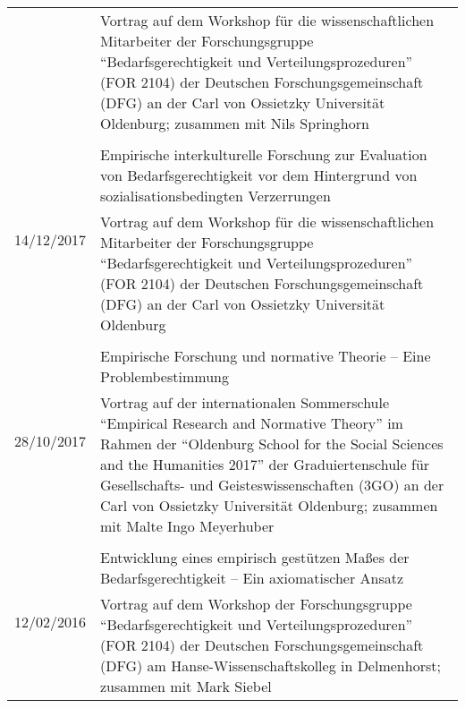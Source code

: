 \documentclass[a4paper,10pt]{article}
\begin{document}
\begin{longtable}{p{2cm}p{}}
& \footnotesize{Vortrag auf dem Workshop für die wissenschaftlichen Mitarbeiter der Forschungsgruppe \enquote{Bedarfsgerechtigkeit und Verteilungsprozeduren} (FOR 2104) der Deutschen Forschungsgemeinschaft (DFG) an der Carl von Ossietzky Universität Oldenburg; zusammen mit Nils Springhorn}\\
\\
\multirow{2}{2cm}{\footnotesize{14/12/2017}} & Empirische interkulturelle Forschung zur Evaluation von Bedarfsgerechtigkeit vor dem Hintergrund von sozialisationsbedingten Verzerrungen\\
& \footnotesize{Vortrag auf dem Workshop für die wissenschaftlichen Mitarbeiter der Forschungsgruppe \enquote{Bedarfsgerechtigkeit und Verteilungsprozeduren} (FOR 2104) der Deutschen Forschungsgemeinschaft (DFG) an der Carl von Ossietzky Universität Oldenburg}\\
\\
\multirow{2}{2cm}{\footnotesize{28/10/2017}} & Empirische Forschung und normative Theorie -- Eine Problembestimmung\\
& \footnotesize{Vortrag auf der internationalen Sommerschule \enquote{Empirical Research and Normative Theory} im Rahmen der \enquote{Oldenburg School for the Social Sciences and the Humanities 2017} der Graduiertenschule für Gesellschafts- und Geisteswissenschaften (3GO) an der Carl von Ossietzky Universität Oldenburg; zusammen mit Malte Ingo Meyerhuber}\\
\\
\multirow{2}{2cm}{\footnotesize{12/02/2016}} & Entwicklung eines empirisch gestützen Maßes der Bedarfsgerechtigkeit -- Ein axiomatischer Ansatz\\
& \footnotesize{Vortrag auf dem Workshop der Forschungsgruppe \enquote{Bedarfsgerechtigkeit und Verteilungsprozeduren} (FOR 2104) der Deutschen Forschungsgemeinschaft (DFG) am Hanse-Wissenschaftskolleg in Delmenhorst; zusammen mit Mark Siebel}\\
\end{longtable}


\clearpage
\end{document}
